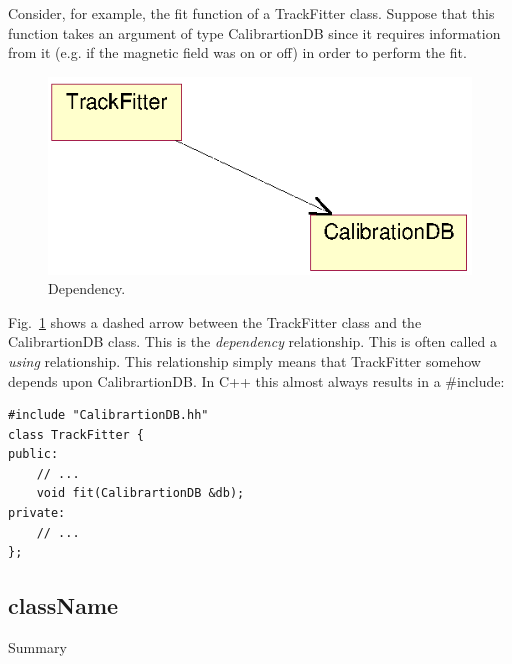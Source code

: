 \begin{Entry}
\begin{Entry}
\begin{Entry}
Consider, for example, the fit function of a TrackFitter class.
Suppose that this function takes an argument of type CalibrartionDB
since it requires information from it (e.g. if the magnetic field was
on or off) in order to perform the fit.
\begin{figure}[htb]
    \begin{center}
        \includegraphics{umlDependency.eps}
        \caption{Dependency.}
        \label{fig:umlDependency}
    \end{center}
\end{figure}
Fig.~\ref{fig:umlDependency} shows a dashed arrow between the
TrackFitter class and the CalibrartionDB class. This is the
\emph{dependency} relationship. This is often called a \emph{using}
relationship.  This relationship simply means that TrackFitter somehow
depends upon CalibrartionDB. In C++ this almost always results in a
\#include:

{\footnotesize
\begin{verbatim}
#include "CalibrartionDB.hh"
class TrackFitter {
public:
    // ...
    void fit(CalibrartionDB &db);
private:
    // ...
};
\end{verbatim}
}%

%
%

\printindex


\bye

%
%

%
%
\subsection{className}
\label{sec:className}
\begin{Entry}
\item[Summary]


\end{Entry}
\end{Entry}
\end{Entry}
\end{Entry}
